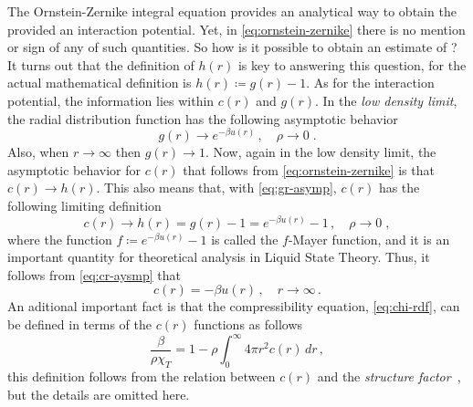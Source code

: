 The Ornstein-Zernike integral equation provides an analytical way to obtain the \rdf 
provided an interaction potential. Yet, in \autoref{eq:ornstein-zernike} there is no 
mention or sign of any of such quantities. So how is it possible to obtain an estimate
of \rdf? It turns out that the definition of $h(r)$ is key to answering this question,
for the actual mathematical definition is $h(r) \coloneqq g(r) - 1$.
As for the interaction potential, the information lies within $c(r)$ and $g(r)$.
In the \emph{low density limit}, the radial distribution function has the following
asymptotic behavior
\begin{equation}
    g(r) \to e^{- \beta u(r)} \, , \quad \rho \to 0 \; .
    \label{eq:gr-asymp}
\end{equation}
Also, when $r \to \infty$ then $g(r) \to 1$. 
Now, again in the low density limit, the asymptotic behavior
for $c(r)$ that follows from \autoref{eq:ornstein-zernike} is that $c(r) \to h(r)$.
This also means that, with \autoref{eq:gr-asymp}, $c(r)$ has the following
limiting definition
\begin{equation}
    c(r) \to h(r) = g(r) - 1 = e^{- \beta u(r)} - 1 \, , \quad \rho \to 0
    \; ,
    \label{eq:cr-aysmp}
\end{equation}
where the function $f \coloneqq e^{- \beta u(r)} - 1$ is called the $f$-Mayer
function, and it is an important quantity for theoretical analysis in Liquid State
Theory. Thus, it follows from \autoref{eq:cr-aysmp} that
\begin{equation}
    c(r) = - \beta u(r) \, , \quad r \to \infty 
    \, .
    \label{eq:cr-r-asymp}
\end{equation}
An aditional important fact is that the compressibility equation, \autoref{eq:chi-rdf},
can be defined in terms of the $c(r)$ functions as follows
\begin{equation}
    \frac{\beta}{\rho \chi_{T}} = 1 - \rho \int_{0}^{\infty} 4 \pi r^2 c(r) \, dr
    \, ,
    \label{eq:compressibility-cr}
\end{equation}
this definition follows from the relation between $c(r)$ and the
\emph{structure factor}~\cite{hansenTheorySimpleLiquids2013}, but the details are omitted 
here.

